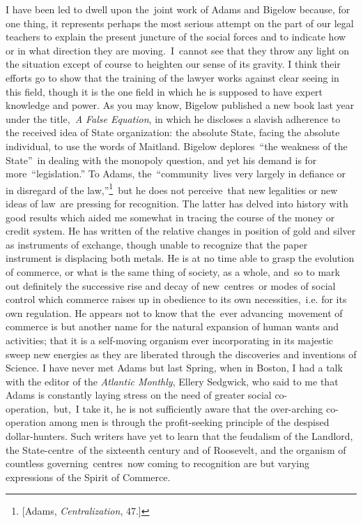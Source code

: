 \documentclass[twoside,symmetric,nobib,justified]{tufte-book}
\begin{document}
I have been led to dwell upon the~joint work of Adams and Bigelow
because, for one thing, it represents perhaps the most serious attempt
on the part of our legal teachers to explain the present juncture of the
social forces and to indicate how or in what direction they are
moving.~I~cannot see that they throw any light on the situation except
of course to heighten our sense of its gravity. I think their efforts go
to show that the training of the lawyer works against clear seeing in
this field, though it is the one field in which he is supposed to have
expert knowledge and power. As you may know, Bigelow published a new
book last year under the title,~\emph{A False Equation}, in which he
discloses a slavish adherence to the received idea of State
organization: the absolute State, facing the absolute individual, to use
the words of Maitland. Bigelow deplores~``the weakness of the State''~in
dealing with the monopoly question, and yet his demand is for
more~``legislation.'' To Adams, the~``community~lives very largely in
defiance or in disregard of the law,''\footnote{{[}Adams,
  \emph{Centralization}, 47.{]}}~but he does not perceive~that new
legalities or new ideas of law~are pressing for recognition. The latter
has delved into history with good results which aided me somewhat in
tracing the course of the money or credit system. He has written of the
relative changes in position of gold and silver as instruments of
exchange, though unable to recognize that the paper instrument is
displacing both metals. He is at no time able to grasp the evolution of
commerce, or what is the same thing of society, as a whole, and~so to
mark out definitely the successive rise and decay of new~centres~or
modes of social control which commerce raises up in obedience to its own
necessities,~i.e. for its own regulation. He appears not to know that
the~ever advancing~movement of commerce is but another name for the
natural expansion of human wants and activities; that it is a
self-moving organism ever incorporating in its majestic sweep new
energies as they are liberated through the discoveries and inventions of
Science. I have never met Adams but last Spring, when in Boston, I had a
talk with the editor of the \emph{Atlantic Monthly}, Ellery Sedgwick,
who said to me that Adams is constantly laying stress on the need of
greater social co-operation,~but,~I take it, he is not sufficiently
aware that the over-arching co-operation among men is through the
profit-seeking principle of the despised dollar-hunters. Such writers
have yet to learn that the feudalism of the Landlord, the
State-centre~of the sixteenth century and of Roosevelt, and the organism
of countless governing~centres~now coming to recognition are but varying
expressions of the Spirit of Commerce.~~
\end{document}

